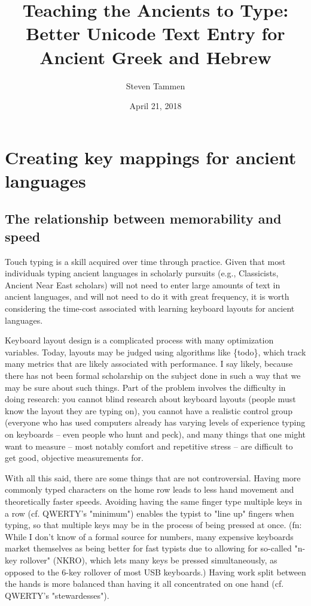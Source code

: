 \documentclass[11pt]{article}
\author{Steven Tammen}
\date{April 21, 2018}
\title{Teaching the Ancients to Type: Better Unicode Text Entry for Ancient Greek and Hebrew}
\begin{document}
\maketitle
\setcounter{tocdepth}{2}
\tableofcontents


\section{Creating key mappings for ancient languages}
\label{sec:org4fae9ac}

\subsection{The relationship between memorability and speed}
\label{sec:orgb16e2dc}

Touch typing is a skill acquired over time through practice. Given that most individuals typing ancient languages in scholarly pursuits (e.g., Classicists, Ancient Near East scholars) will not need to enter large amounts of text in ancient languages, and will not need to do it with great frequency, it is worth considering the time-cost associated with learning keyboard layouts for ancient languages.

Keyboard layout design is a complicated process with many optimization variables. Today, layouts may be judged using algorithms like \{todo\}, which track many metrics that are likely associated with performance. I say likely, because there has not been formal scholarship on the subject done in such a way that we may be sure about such things. Part of the problem involves the difficulty in doing research: you cannot blind research about keyboard layouts (people must know the layout they are typing on), you cannot have a realistic control group (everyone who has used computers already has varying levels of experience typing on keyboards -- even people who hunt and peck), and many things that one might want to measure -- most notably comfort and repetitive stress -- are difficult to get good, objective measurements for.

With all this said, there are some things that are not controversial. Having more commonly typed characters on the home row leads to less hand movement and theoretically faster speeds. Avoiding having the same finger type multiple keys in a row (cf. QWERTY's "minimum") enables the typist to "line up" fingers when typing, so that multiple keys may be in the process of being pressed at once. (fn: While I don't know of a formal source for numbers, many expensive keyboards market themselves as being better for fast typists due to allowing for so-called "n-key rollover" (NKRO), which lets many keys be pressed simultaneously, as opposed to the 6-key rollover of most USB keyboards.) Having work split between the hands is more balanced than having it all concentrated on one hand (cf. QWERTY's "stewardesses").
\end{document}
